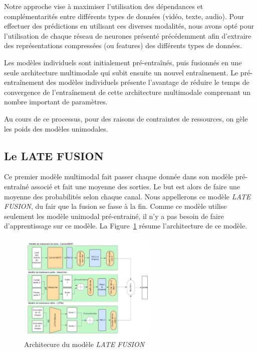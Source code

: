 Notre approche vise à maximiser l'utilisation des dépendances et complémentarités entre différents types de données (vidéo, texte,
audio). Pour effectuer des prédictions en utilisant ces diverses modalités, nous avons opté pour l'utilisation de chaque réseau de
neurones présenté précédemment afin d'extraire des représentations compressées (ou features) des différents types de données. 

Les modèles individuels sont initialement pré-entraînés, puis fusionnés en une seule architecture multimodale qui subit ensuite un
nouvel entraînement. Le pré-entraînement des modèles individuels présente l'avantage de réduire le temps de convergence de
l'entraînement de cette architecture multimodale comprenant un nombre important de paramètres.

Au cours de ce processus, pour des raisons de contraintes de ressources, on gèle les poids des modèles unimodales.

\subsection{Le LATE FUSION}
Ce premier modèle multimodal fait passer chaque donnée dans son modèle pré-entraîné associé et fait une moyenne des sorties. Le but
est alors de faire une moyenne des probabilités selon chaque canal. Nous appellerons ce modèle \textit{LATE FUSION}, du fair que la 
fusion se fasse à la fin. Comme ce modèle utilise seulement les modèle unimodal pré-entrainé, il n'y a pas besoin de faire 
d'apprentissage sur ce modèle.
La Figure~\ref{fig: LATE FUSION} résume l'architecture de ce modèle.

\begin{figure}[H]
    \centering
    \includegraphics[width=0.6\textwidth]{image_model/late_fusion.png}
    \caption{Architecure du modèle \textit{LATE FUSION}}
    \label{fig: LATE FUSION}
\end{figure}

